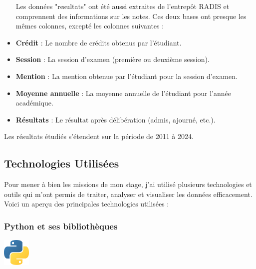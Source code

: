 \begin{itemize}
    Les données "resultats" ont été aussi extraites de l'entrepôt RADIS et comprennent des informations sur les notes. Ces deux bases ont presque les mêmes colonnes, excepté les colonnes suivantes :
    \item \textbf{Crédit} : Le nombre de crédits obtenus par l'étudiant. 
    \item \textbf{Session} : La session d'examen (première ou deuxième session).
    \item \textbf{Mention} : La mention obtenue par l'étudiant pour la session d'examen. 
    \item \textbf{Moyenne annuelle} : La moyenne annuelle de l'étudiant pour l'année académique. 
    \item \textbf{Résultats} : Le résultat après délibération (admis, ajourné, etc.). 
\end{itemize} 

\begin{tcolorbox}[colback=gray!10, colframe=gray!60!black, title=\faInfoCircle~Remarque]
Les résultats étudiés s'étendent sur la période de 2011 à 2024.
\end{tcolorbox}  

\subsection{Technologies Utilisées}
Pour mener à bien les missions de mon stage, j'ai utilisé plusieurs technologies et outils qui m'ont permis de traiter, analyser et visualiser les données efficacement. Voici un aperçu des principales technologies utilisées :

\subsubsection{Python et ses bibliothèques}

\begin{center}
    \includegraphics[width=0.1\textwidth]{image/python.png} 
\end{center}

